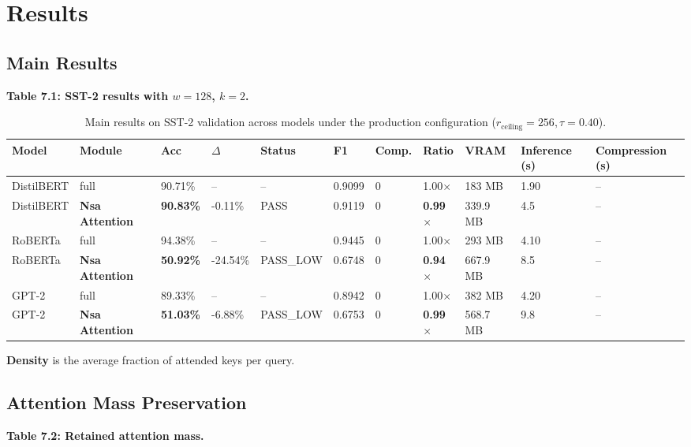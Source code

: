 
\section{Results}

\subsection{Main Results}

\textbf{Table 7.1: SST-2 results with $w = 128$, $k = 2$.}

\begin{table}[t]
\centering
\small
\begin{tabular}{lllllllllll}
\toprule
\textbf{Model} & \textbf{Module} & \textbf{Acc} & \textbf{$\Delta$} & \textbf{Status} & \textbf{F1} & \textbf{Comp.} & \textbf{Ratio} & \textbf{VRAM} & \textbf{Inference (s)} & \textbf{Compression (s)} \\
\midrule
DistilBERT & full & 90.71\% & -- & -- & 0.9099 & 0 & 1.00$\times$ & 183 MB & 1.90 & -- \\
DistilBERT & \textbf{Nsa Attention} & \textbf{90.83\%} & -0.11\% & PASS & 0.9119 & 0 & \textbf{0.99$\times$} & 339.9 MB & 4.5 & -- \\
RoBERTa & full & 94.38\% & -- & -- & 0.9445 & 0 & 1.00$\times$ & 293 MB & 4.10 & -- \\
RoBERTa & \textbf{Nsa Attention} & \textbf{50.92\%} & -24.54\% & PASS\_LOW & 0.6748 & 0 & \textbf{0.94$\times$} & 667.9 MB & 8.5 & -- \\
GPT-2 & full & 89.33\% & -- & -- & 0.8942 & 0 & 1.00$\times$ & 382 MB & 4.20 & -- \\
GPT-2 & \textbf{Nsa Attention} & \textbf{51.03\%} & -6.88\% & PASS\_LOW & 0.6753 & 0 & \textbf{0.99$\times$} & 568.7 MB & 9.8 & -- \\
\bottomrule
\end{tabular}
\caption{Main results on SST-2 validation across models under the production configuration ($r_{\mathrm{ceiling}}=256, \tau=0.40$).}
\label{tab:main_sst2}
\end{table}

\textbf{Density} is the average fraction of attended keys per query.

\subsection{Attention Mass Preservation}

\textbf{Table 7.2: Retained attention mass.}

